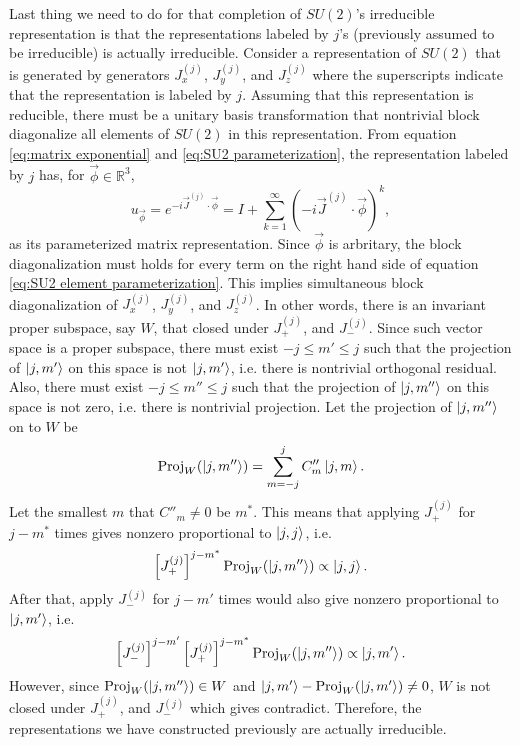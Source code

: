 \documentclass[preprint, 12pt]{revtex4-2}
\numberwithin{equation}{section}
\begin{document}
Last thing we need to do for that completion of $SU(2)$'s irreducible representation is that the representations labeled by $j$'s (previously assumed to be irreducible) is actually irreducible. Consider a representation of $SU(2)$ that is generated by generators  $J^{(j)}_x$, $J^{(j)}_y$, and $J^{(j)}_z$ where the superscripts indicate that the representation is labeled by $j$. Assuming that this representation is reducible, there must be a unitary basis transformation that nontrivial block diagonalize all elements of $SU(2)$ in this representation. From equation \ref{eq:matrix exponential} and \ref{eq:SU2 parameterization}, the representation labeled by $j$ has, for $\vec{\phi}\in\mathbb{R}^3$,
\begin{equation}\label{eq:SU2 element parameterization}
    u_{\vec{\phi}} = e^{-i\vec{J}^{(j)}\cdot\vec{\phi}} = I+\sum_{k=1}^{\infty}(-i\vec{J}^{(j)}\cdot\vec{\phi})^k,
\end{equation}
as its parameterized matrix representation. Since $\vec{\phi}$ is arbritary, the block diagonalization must holds for every term on the right hand side of equation \ref{eq:SU2 element parameterization}. This implies simultaneous block diagonalization of $J^{(j)}_x$, $J^{(j)}_y$, and $J^{(j)}_z$. In other words, there is an invariant proper subspace, say $W$, that closed under $J^{(j)}_+$, and $J^{(j)}_-$. Since such vector space is a proper subspace, there must exist $-j\leq m'\leq j$ such that the projection of $\ket{j, m'}$ on this space is not $\ket{j, m'}$, i.e. there is nontrivial orthogonal residual. Also, there must exist $-j\leq m''\leq j$ such that the projection of $\ket{j, m''}$ on this space is not zero, i.e. there is nontrivial projection. Let the projection of $\ket{j, m''}$ on to $W$ be
\begin{equation}\label{eq:SU2 projection}
    \text{Proj}_W(\ket{j, m''}) = \sum_{m = -j}^{j}C''_m\ket{j,m}.
\end{equation}
Let the smallest $m$ that $C''_m\neq 0$ be $m^*$. This means that applying $J^{(j)}_+$ for $j-m^*$ times gives nonzero proportional to $\ket{j,j}$, i.e.
\begin{equation}\label{eq:projection extremum}
    \left[J^{(j)}_+\right]^{j-m^*}\text{Proj}_W(\ket{j, m''}) \propto \ket{j, j}.
\end{equation}
After that, apply $J^{(j)}_-$ for $j-m'$ times would also give nonzero proportional to $\ket{j,m'}$, i.e.
\begin{equation}\label{eq:projection to orthogonal}
    \left[J^{(j)}_-\right]^{j-m'}\left[J^{(j)}_+\right]^{j-m^*}\text{Proj}_W(\ket{j, m''}) \propto \ket{j, m'}.
\end{equation}
However, since $\text{Proj}_W(\ket{j, m''})\in W$ and $\ket{j, m'}-\text{Proj}_W(\ket{j, m'})\neq 0$, $W$ is not closed under $J^{(j)}_+$, and $J^{(j)}_-$ which gives contradict. Therefore, the representations we have constructed previously are actually irreducible.
\end{document}
